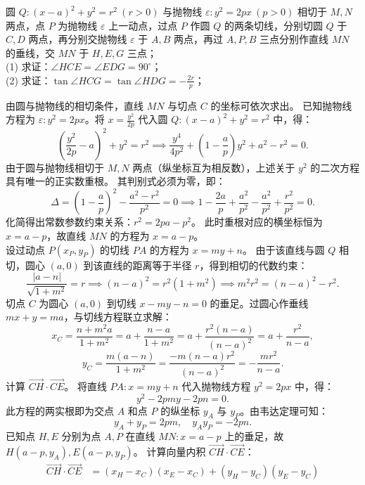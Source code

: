 \begin{example}
圆 $Q: (x - a)^2 + y^2 = r^2\ (r > 0)$ 与抛物线 $\varepsilon: y^2 = 2px\ (p > 0)$ 相切于 $M,N$ 两点，点 $P$ 为抛物线 $\varepsilon$ 上一动点，过点 $P$ 作圆 $Q$ 的两条切线，分别切圆 $Q$ 于 $C,D$ 两点，再分别交抛物线 $\varepsilon$ 于 $A,B$ 两点，再过 $A,P,B$ 三点分别作直线 $MN$ 的垂线，交 $MN$ 于 $H,E,G$ 三点；\\
(1) 求证：$\angle HCE = \angle EDG = 90^\circ$；\\
(2) 求证：$\tan\angle HCG = \tan\angle HDG = -\frac{2r}{p}$；
\end{example}
\begin{solution}
由圆与抛物线的相切条件，直线 $MN$ 与切点 $C$ 的坐标可依次求出。
已知抛物线方程为 $\varepsilon: y^2 = 2px$。将 $x = \frac{y^2}{2p}$ 代入圆 $Q: (x - a)^2 + y^2 = r^2$ 中，得：
\[ \left(\frac{y^2}{2p} - a\right)^2 + y^2 = r^2 \implies \frac{y^4}{4p^2} + \left(1 - \frac{a}{p}\right)y^2 + a^2 - r^2 = 0. \]
由于圆与抛物线相切于 $M, N$ 两点（纵坐标互为相反数），上述关于 $y^2$ 的二次方程具有唯一的正实数重根。
其判别式必须为零，即：
\[ \Delta = \left(1 - \frac{a}{p}\right)^2 - \frac{a^2 - r^2}{p^2} = 0 \implies 1 - \frac{2a}{p} + \frac{a^2}{p^2} - \frac{a^2}{p^2} + \frac{r^2}{p^2} = 0. \]
化简得出常数参数约束关系：$r^2 = 2pa - p^2$。
此时重根对应的横坐标恒为 $x = a - p$，故直线 $MN$ 的方程为 $x = a - p$。\\
设过动点 $P(x_P, y_P)$ 的切线 $PA$ 的方程为 $x = my + n$。
由于该直线与圆 $Q$ 相切，圆心 $(a, 0)$ 到该直线的距离等于半径 $r$，得到相切的代数约束：
\[ \frac{|a - n|}{\sqrt{1 + m^2}} = r \implies (n - a)^2 = r^2(1 + m^2) \implies m^2 r^2 = (n - a)^2 - r^2. \]
切点 $C$ 为圆心 $(a, 0)$ 到切线 $x - my - n = 0$ 的垂足。过圆心作垂线 $mx + y = ma$，与切线方程联立求解：
\[ x_C = \frac{n + m^2 a}{1 + m^2} = a + \frac{n - a}{1 + m^2} = a + \frac{r^2(n - a)}{(n - a)^2} = a + \frac{r^2}{n - a}, \]
\[ y_C = \frac{m(a - n)}{1 + m^2} = \frac{-m(n - a)r^2}{(n - a)^2} = -\frac{m r^2}{n - a}. \]
计算 $\overrightarrow{CH} \cdot \overrightarrow{CE}$。
将直线 $PA: x = my + n$ 代入抛物线方程 $y^2 = 2px$ 中，得：
\[ y^2 - 2pmy - 2pn = 0. \]
此方程的两实根即为交点 $A$ 和点 $P$ 的纵坐标 $y_A$ 与 $y_P$。由韦达定理可知：
\[ y_A + y_P = 2pm, \quad y_A y_P = -2pn. \]
已知点 $H, E$ 分别为点 $A, P$ 在直线 $MN: x = a - p$ 上的垂足，故 $H(a - p, y_A), E(a - p, y_P)$。
计算向量内积 $\overrightarrow{CH} \cdot \overrightarrow{CE}$：
\begin{align*}
\overrightarrow{CH} \cdot \overrightarrow{CE} &= (x_H - x_C)(x_E - x_C) + (y_H - y_C)(y_E - y_C) \\

\end{align*}
\end{solution}
